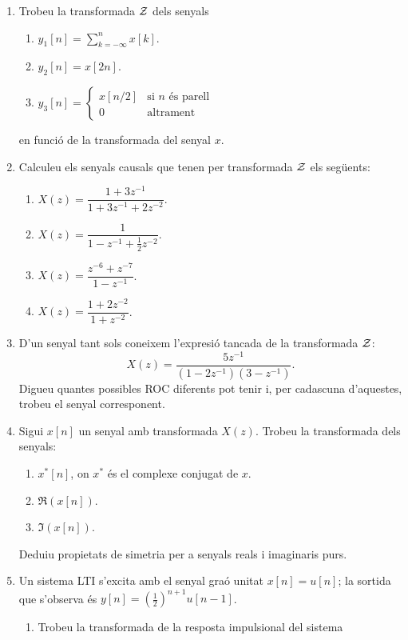 \documentclass[a4paper,12pt]{article}
\newcommand\cZ{{\cal Z}}
\begin{document}
\begin{enumerate}
  \begin{figure*}[htbp]
    \centering
    
    
  \end{figure*}
\item Trobeu la transformada $\cZ$ dels senyals
  \begin{enumerate}
  \item $y_1[n]=\sum_{k=-\infty}^n x[k]$.
  \item $y_2[n]=x[2n]$.
  \item $y_3[n]=\begin{cases} x[n/2] & \text{si $n$ és parell} \\
      0 &\text{altrament}
    \end{cases}$
  \end{enumerate}
  en funció de la transformada del senyal $x$.
\item Calculeu els senyals causals que tenen per transformada $\cZ$
  els següents:
  \begin{enumerate}
  \item $X(z)=\dfrac{1+3z^{-1}}{1+3z^{-1}+2z^{-2}}$.
  \item $X(z)=\dfrac{1}{1-z^{-1}+\frac12 z^{-2}}$.
  \item $X(z)=\dfrac{z^{-6}+z^{-7}}{1-z^{-1}}$.
  \item $X(z)=\dfrac{1+2z^{-2}}{1+z^{-2}}$.
  \end{enumerate}
\item D'un senyal tant sols coneixem l'expresió tancada de la
  transformada $\cZ$:
  $$X(z)=\frac{5z^{-1}}{(1-2z^{-1})(3-z^{-1})}.$$
  Digueu quantes possibles ROC diferents pot tenir i, per cadascuna
  d'aquestes, trobeu el senyal corresponent.
\item Sigui $x[n]$ un senyal amb transformada $X(z)$. Trobeu la
  transformada dels senyals:
  \begin{enumerate}
  \item $x^*[n]$, on $x^*$ és el complexe conjugat de $x$.
  \item $\Re(x[n])$.
  \item $\Im(x[n])$.
  \end{enumerate}
  Deduiu propietats de simetria per a senyals reals i imaginaris purs.
\item Un sistema LTI s'excita amb el senyal graó unitat $x[n]=u[n]$;
  la sortida que s'observa és $y[n]=(\frac12)^{n+1}u[n-1]$.
  \begin{enumerate}
  \item Trobeu la transformada de la resposta impulsional del sistema

\end{enumerate}
\end{enumerate}
\end{document}
